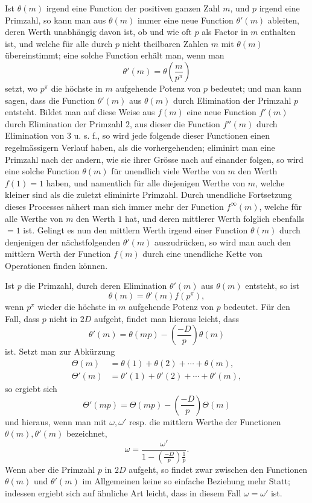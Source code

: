 \documentclass[12pt]{article}
\begin{document}
Ist \(\theta(m)\) irgend eine Function der positiven ganzen Zahl \(m\), und \(p\) irgend eine Primzahl, so kann man aus \(\theta(m)\) immer eine neue Function \(\theta'(m)\) ableiten, deren Werth unabhängig davon ist, ob und wie oft \(p\) als Factor in \(m\) enthalten ist, und welche für alle durch \(p\) nicht theilbaren Zahlen \(m\) mit \(\theta(m)\) übereinstimmt; eine solche Function erhält man, wenn man
\[
\theta'(m)=\theta\!\left(\frac{m}{p^\pi}\right)
\]
setzt, wo \(p^\pi\) die höchste in \(m\) aufgehende Potenz von \(p\) bedeutet; und man kann sagen, dass die Function \(\theta'(m)\) aus \(\theta(m)\) durch Elimination der Primzahl \(p\) entsteht. Bildet man auf diese Weise aus \(f(m)\) eine neue Function \(f'(m)\) durch Elimination der Primzahl \(2\), aus dieser die Function \(f''(m)\) durch Elimination von \(3\) u. s. f., so wird jede folgende dieser Functionen einen regelmässigern Verlauf haben, als die vorhergehenden; eliminirt man eine Primzahl nach der andern, wie sie ihrer Grösse nach auf einander folgen, so wird eine solche Function \(\theta(m)\) für unendlich viele Werthe von \(m\) den Werth \(f(1)=1\) haben, und namentlich für alle diejenigen Werthe von \(m\), welche kleiner sind als die zuletzt eliminirte Primzahl. Durch unendliche Fortsetzung dieses Processes nähert man sich immer mehr der Function \(f^\infty(m)\), welche für alle Werthe von \(m\) den Werth \(1\) hat, und deren mittlerer Werth folglich ebenfalls \(=1\) ist. Gelingt es nun den mittlern Werth irgend einer Function \(\theta(m)\) durch denjenigen der nächstfolgenden \(\theta'(m)\) auszudrücken, so wird man auch den mittlern Werth der Function \(f(m)\) durch eine unendliche Kette von Operationen finden können.

Ist \(p\) die Primzahl, durch deren Elimination \(\theta'(m)\) aus \(\theta(m)\) entsteht, so ist
\[
\theta(m)=\theta'(m)f(p^\pi),
\]
wenn \(p^\pi\) wieder die höchste in \(m\) aufgehende Potenz von \(p\) bedeutet. Für den Fall, dass \(p\) nicht in \(2D\) aufgeht, findet man hieraus leicht, dass
\[
\theta'(m)=\theta(mp)-\left(\frac{-D}{p}\right)\theta(m)
\]
ist. Setzt man zur Abkürzung
\[
\begin{aligned}
\Theta(m)&=\theta(1)+\theta(2)+\cdots+\theta(m),\\
\Theta'(m)&=\theta'(1)+\theta'(2)+\cdots+\theta'(m),
\end{aligned}
\]
so ergiebt sich
\[
\Theta'(mp)=\Theta(mp)-\left(\frac{-D}{p}\right)\Theta(m)
\]
und hieraus, wenn man mit \(\omega,\omega'\) resp. die mittlern Werthe der Functionen \(\theta(m),\theta'(m)\) bezeichnet,
\[
\omega=\frac{\omega'}{1-\left(\frac{-D}{p}\right)\frac1p}.
\]
Wenn aber die Primzahl \(p\) in \(2D\) aufgeht, so findet zwar zwischen den Functionen \(\theta(m)\) und \(\theta'(m)\) im Allgemeinen keine so einfache Beziehung mehr Statt; indessen ergiebt sich auf ähnliche Art leicht, dass in diesem Fall \(\omega=\omega'\) ist.
\end{document}
